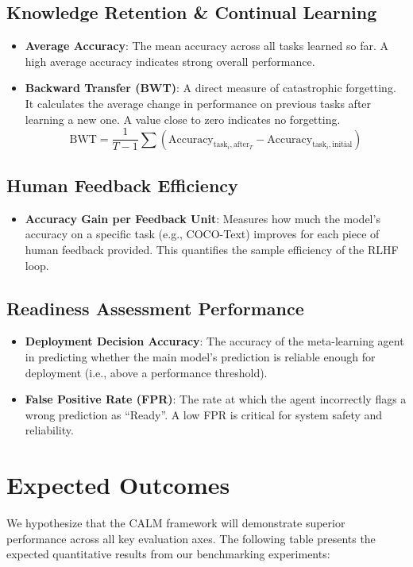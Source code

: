 \documentclass[12pt]{article}
\begin{document}
\subsection{Knowledge Retention \& Continual Learning}
\begin{itemize}
    \item \textbf{Average Accuracy}: The mean accuracy across all tasks learned so far. A high average accuracy indicates strong overall performance.
    \item \textbf{Backward Transfer (BWT)}: A direct measure of catastrophic forgetting. It calculates the average change in performance on previous tasks after learning a new one. A value close to zero indicates no forgetting.
    \[
    \text{BWT} = \frac{1}{T-1} \sum (\text{Accuracy}_{\text{task}_i,\text{after}_T} - \text{Accuracy}_{\text{task}_i,\text{initial}})
    \]
\end{itemize}

\subsection{Human Feedback Efficiency}
\begin{itemize}
    \item \textbf{Accuracy Gain per Feedback Unit}: Measures how much the model's accuracy on a specific task (e.g., COCO-Text) improves for each piece of human feedback provided. This quantifies the sample efficiency of the RLHF loop.
\end{itemize}

\subsection{Readiness Assessment Performance}
\begin{itemize}
    \item \textbf{Deployment Decision Accuracy}: The accuracy of the meta-learning agent in predicting whether the main model's prediction is reliable enough for deployment (i.e., above a performance threshold).
    \item \textbf{False Positive Rate (FPR)}: The rate at which the agent incorrectly flags a wrong prediction as ``Ready''. A low FPR is critical for system safety and reliability.
\end{itemize}

\section{Expected Outcomes}
We hypothesize that the CALM framework will demonstrate superior performance across all key evaluation axes. The following table presents the expected quantitative results from our benchmarking experiments:
\end{document}
